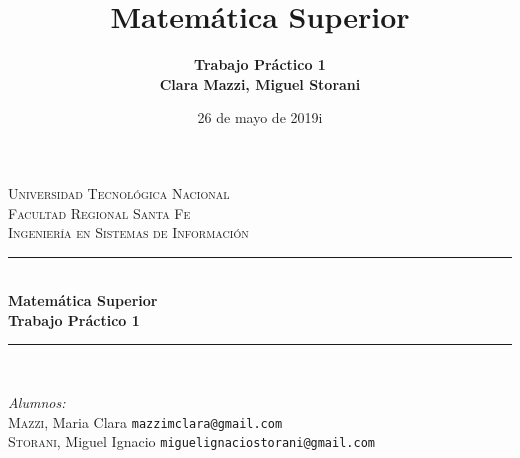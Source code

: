 \documentclass[12pt]{article}
\title{Matemática Superior}
\author{\bfseries{Trabajo Práctico 1}\\
Clara Mazzi, Miguel Storani}
\date{26 de mayo de 2019i}
\begin{document}
\pagestyle{empty}

\begin{titlepage}

\newcommand{\HRule}{\rule{\linewidth}{0.5mm}} %

\begin{center} %
 

\textsc{\LARGE Universidad Tecnológica Nacional}\\[0.5cm]				%
\textsc{\Large Facultad Regional Santa Fe}\\[1.5cm]						%
\textsc{\large Ingeniería en Sistemas de Información}\\[0.5cm]			%


\HRule \\[0.9cm]
{ \huge \bfseries Matemática Superior}\\[0.4cm]
{ \large \bfseries Trabajo Práctico 1}\\[0.7cm] %
\HRule \\[1.5cm]


\begin{minipage}{0.8\textwidth}
\begin{flushleft}\large
\emph{Alumnos:} \\
\hspace{0.5cm}  \textsc{Mazzi}, Maria Clara
{\small \texttt{mazzimclara@gmail.com}}\\
\hspace{0.5cm}  \textsc{Storani}, Miguel Ignacio
{\small \texttt{miguelignaciostorani@gmail.com}}\\




\end{flushleft}
\end{minipage}
\end{center}
\end{titlepage}
\end{document}
